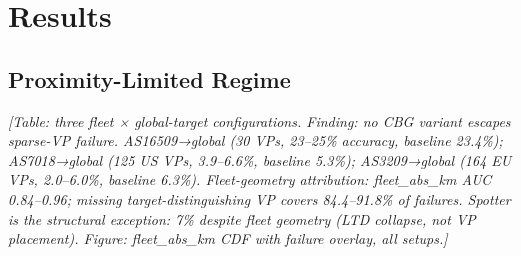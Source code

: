 \section{Results}
\label{sec:results}


\subsection{Proximity-Limited Regime}
\label{sec:results-proximity-limited}
\textit{[Table: three fleet × global-target configurations. Finding: no CBG variant escapes
sparse-VP failure. AS16509→global (30 VPs, 23--25\% accuracy, baseline 23.4\%);
AS7018→global (125 US VPs, 3.9--6.6\%, baseline 5.3\%);
AS3209→global (164 EU VPs, 2.0--6.0\%, baseline 6.3\%).
Fleet-geometry attribution: fleet\_abs\_km AUC 0.84--0.96; missing target-distinguishing VP covers
84.4--91.8\% of failures. Spotter is the structural exception: 7\% despite fleet geometry (LTD
collapse, not VP placement).
Figure: fleet\_abs\_km CDF with failure overlay, all setups.]}



%
%
%

